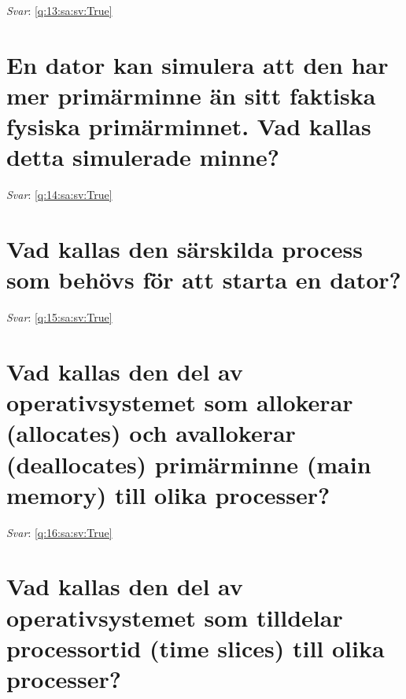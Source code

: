 \documentclass[a4paper,11pt,oneside]{book}
\begin{document}
\begin{sloppypar}
\vspace{1cm}

\textit{Svar}: \autoref{q:13:sa:sv:True}



\section{En dator kan simulera att den har mer prim\"arminne \"an sitt faktiska fysiska prim\"arminnet. Vad kallas detta simulerade minne?}

\label{q:14:sa:sv:False}

\vspace{2cm}

\noindent\makebox[\textwidth]{\hrulefill}

\vspace{1cm}

\textit{Svar}: \autoref{q:14:sa:sv:True}



\section{Vad kallas den s\"arskilda process som beh\"ovs f\"or att starta en dator?}

\label{q:15:sa:sv:False}

\vspace{2cm}

\noindent\makebox[\textwidth]{\hrulefill}

\vspace{1cm}

\textit{Svar}: \autoref{q:15:sa:sv:True}



\section{Vad kallas den del av operativsystemet som allokerar (allocates) och avallokerar (deallocates) prim\"arminne (main memory) till olika processer?}

\label{q:16:sa:sv:False}

\vspace{2cm}

\noindent\makebox[\textwidth]{\hrulefill}

\vspace{1cm}

\textit{Svar}: \autoref{q:16:sa:sv:True}



\section{Vad kallas den del av operativsystemet som tilldelar processortid (time slices) till olika processer?}


\end{sloppypar}
\end{document}
